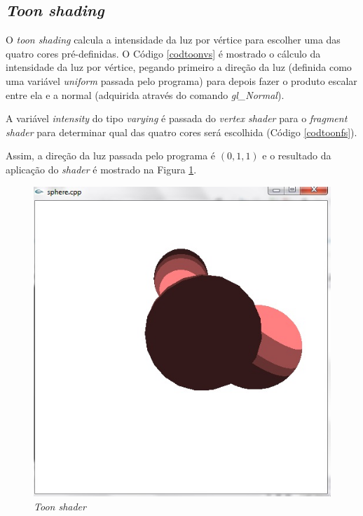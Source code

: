\subsection{\textit{Toon shading}}

	O  \textit{toon shading} calcula a intensidade da luz por vértice para escolher uma das quatro cores pré-definidas. O Código  \ref{codtoonvs} é mostrado o cálculo da intensidade da luz por vértice, pegando primeiro a direção da luz (definida como uma variável \textit{uniform} passada pelo programa) para depois fazer o produto escalar entre ela e a normal (adquirida através do comando \textit{gl\_Normal}).  

	

	A variável \textit{intensity} do tipo \textit{varying} é passada do \textit{vertex shader} para o \textit{fragment shader} para determinar qual das quatro cores será escolhida (Código \ref{codtoonfs}). 
  
 	

	Assim, a direção da luz passada pelo programa é $(0 , 1 , 1)$ e o resultado da aplicação do \textit{shader} é mostrado na  Figura \ref{toon_shader}.

	\begin{figure}[h]
	\centering
		\includegraphics[keepaspectratio=true,scale=0.6]{figuras/toon_shader.jpg}
	\caption{\textit{Toon shader}}
	\label{toon_shader}
	\end{figure}

